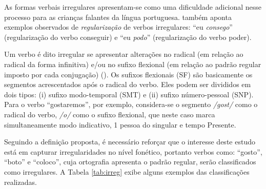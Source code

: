 As formas verbais irregulares apresentam-se como uma dificuldade adicional nesse processo para as crianças falantes da língua portuguesa. \cite{wuerges:2014} também aponta exemplos observados de \textit{regularização} de verbos irregulares: “eu \textit{consego}” (regularização do verbo conseguir) e “eu \textit{podo}” (regularização do verbo poder).

Um verbo é dito irregular se apresentar alterações no radical (em relação ao radical da forma infinitiva) e/ou no sufixo flexional (em relação ao padrão regular imposto por cada conjugação) (\cite{wuerges:2014}). Os sufixos flexionais (SF) são basicamente os segmentos acrescentados após o radical do verbo. Eles podem ser divididos em dois tipos: (i) sufixo modo-temporal (SMT) e (ii) sufixo número-pessoal (SNP). Para o verbo “gostaremos”, por exemplo, considera-se o segmento \textit{/gost/} como o radical do verbo, \textit{/o/} como o sufixo flexional, que neste caso marca simultaneamente modo indicativo, 1 pessoa do singular e tempo Presente.





Seguindo a definição proposta, é necessário reforçar que o interesse deste estudo está em capturar irregularidades no nível fonético, portanto verbos como: “gosto”, “boto” e “coloco”, cuja ortografia apresenta o padrão regular, serão classificados como irregulares. A Tabela \ref{tab:irreg} exibe alguns exemplos das classificações realizadas.

